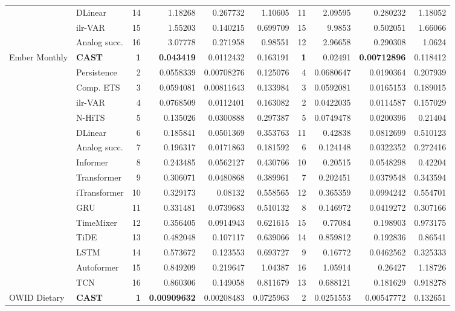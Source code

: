 \begin{longtable}{@{}llrrrrrrrr@{}}
 & DLinear & 14 & 1.18268 & 0.267732 & 1.10605 & 11 & 2.09595 & 0.280232 & 1.18052 \\
 & ilr-VAR & 15 & 1.55203 & 0.140215 & 0.699709 & 15 & 9.9853 & 0.502051 & 1.66066 \\
 & Analog succ. & 16 & 3.07778 & 0.271958 & 0.98551 & 12 & 2.96658 & 0.290308 & 1.0624 \\
\addlinespace
Ember Monthly & \textbf{CAST} & \textbf{1} & \textbf{0.043419} & 0.0112432 & 0.163191 & \textbf{1} & 0.02491 & \textbf{0.00712896} & 0.118412 \\
 & Persistence & 2 & 0.0558339 & 0.00708276 & 0.125076 & 4 & 0.0680647 & 0.0190364 & 0.207939 \\
 & Comp. ETS & 3 & 0.0594081 & 0.00811643 & 0.133984 & 3 & 0.0592081 & 0.0165153 & 0.189015 \\
 & ilr-VAR & 4 & 0.0768509 & 0.0112401 & 0.163082 & 2 & 0.0422035 & 0.0114587 & 0.157029 \\
 & N-HiTS & 5 & 0.135026 & 0.0300888 & 0.297387 & 5 & 0.0749478 & 0.0200396 & 0.21404 \\
 & DLinear & 6 & 0.185841 & 0.0501369 & 0.353763 & 11 & 0.42838 & 0.0812699 & 0.510123 \\
 & Analog succ. & 7 & 0.196317 & 0.0171863 & 0.181592 & 6 & 0.124148 & 0.0322352 & 0.272416 \\
 & Informer & 8 & 0.243485 & 0.0562127 & 0.430766 & 10 & 0.20515 & 0.0548298 & 0.42204 \\
 & Transformer & 9 & 0.306071 & 0.0480868 & 0.389961 & 7 & 0.202451 & 0.0379548 & 0.343594 \\
 & iTransformer & 10 & 0.329173 & 0.08132 & 0.558565 & 12 & 0.365359 & 0.0994242 & 0.554701 \\
 & GRU & 11 & 0.331481 & 0.0739683 & 0.510132 & 8 & 0.146972 & 0.0419272 & 0.307166 \\
 & TimeMixer & 12 & 0.356405 & 0.0914943 & 0.621615 & 15 & 0.77084 & 0.198903 & 0.973175 \\
 & TiDE & 13 & 0.482048 & 0.107117 & 0.639066 & 14 & 0.859812 & 0.192836 & 0.86541 \\
 & LSTM & 14 & 0.573672 & 0.123553 & 0.693727 & 9 & 0.16772 & 0.0462562 & 0.325333 \\
 & Autoformer & 15 & 0.849209 & 0.219647 & 1.04387 & 16 & 1.05914 & 0.26427 & 1.18726 \\
 & TCN & 16 & 0.860306 & 0.149058 & 0.811679 & 13 & 0.688121 & 0.181629 & 0.918278 \\
\addlinespace
OWID Dietary & \textbf{CAST} & \textbf{1} & \textbf{0.00909632} & 0.00208483 & 0.0725963 & 2 & 0.0251553 & 0.00547772 & 0.132651 \\

\end{longtable}
